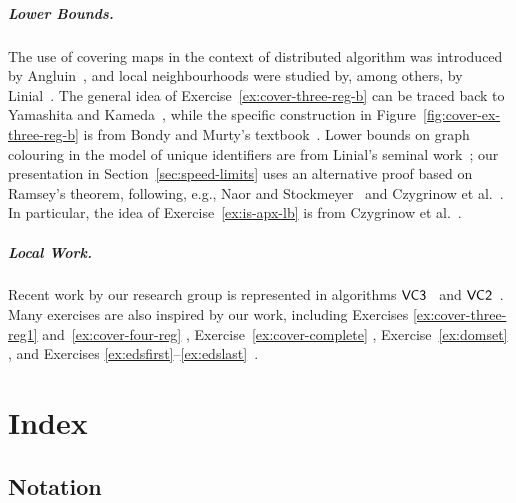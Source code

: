 \paragraph{Lower Bounds.}

The use of covering maps in the context of distributed algorithm was introduced by Angluin~\cite{angluin80local}, and local neighbourhoods were studied by, among others, by Linial~\cite{linial92locality}. The general idea of Exercise~\ref{ex:cover-three-reg-b} can be traced back to Yamashita and Kameda~\cite{yamashita96computing}, while the specific construction in Figure~\ref{fig:cover-ex-three-reg-b} is from Bondy and Murty's textbook~\cite[Figure~5.10]{bondy76graph-theory}. Lower bounds on graph colouring in the model of unique identifiers are from Linial's seminal work~\cite{linial92locality}; our presentation in Section~\ref{sec:speed-limits} uses an alternative proof based on Ramsey's theorem, following, e.g., Naor and Stockmeyer~\cite{naor95what} and Czygrinow et al.~\cite{czygrinow08fast}. In particular, the idea of Exercise~\ref{ex:is-apx-lb} is from Czygrinow et al.~\cite{czygrinow08fast}.

\paragraph{Local Work.}

Recent work by our research group is represented in algorithms $\textsf{VC3}$~\cite{polishchuk09simple} and $\textsf{VC2}$~\cite{astrand09vc2apx}. Many exercises are also inspired by our work, including Exercises \ref{ex:cover-three-reg1} and~\ref{ex:cover-four-reg} \cite{suomela10eds}, Exercise~\ref{ex:cover-complete} \cite{astrand10weakly-coloured}, Exercise~\ref{ex:domset} \cite{astrand10weakly-coloured}, and Exercises \ref{ex:edsfirst}--\ref{ex:edslast}~\cite{suomela10eds}.


\backmatter

\chapter{Index}

\section*{Notation}

